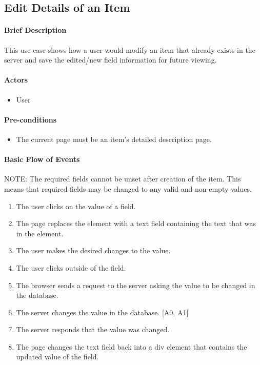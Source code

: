 \documentclass{article}
\begin{document}
\subsection{Edit Details of an Item}

\paragraph{Brief Description}
This use case shows how a user would modify an item that already exists in the server and save the edited/new field information for future viewing.

\paragraph{Actors}
\begin{itemize}
\item User
\end{itemize}

\paragraph{Pre-conditions}
\begin{itemize}
\item The current page must be an item's detailed description page.
\end{itemize}

\paragraph{Basic Flow of Events}
NOTE: The required fields cannot be unset after creation of the item.  This means that required fields may be changed to any valid and non-empty values.
\begin{enumerate}
\item The user clicks on the value of a field.
\item The page replaces the element with a text field containing the text that was in the element.
\item The user makes the desired changes to the value.
\item The user clicks outside of the field.
\item The browser sends a request to the server asking the value to be changed in the database.
\item The server changes the value in the database. [A0, A1]
\item The server responds that the value was changed.
\item The page changes the text field back into a div element that contains the updated value of the field.
\end{enumerate}
\end{document}
